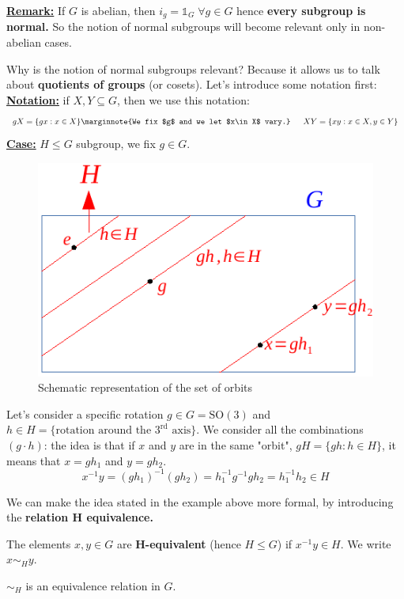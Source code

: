 \documentclass[../main.tex]{subfiles}
\begin{document}
\underline{\textbf{Remark:}} If $G$ is abelian, then $i_g=\mathbb{1}_G\;\forall g\in G$ hence \textbf{every subgroup is normal.} So the notion of normal subgroups will become relevant only in non-abelian cases.

Why is the notion of normal subgroups relevant? Because it allows us to talk about \textbf{quotients of groups} (or cosets). Let's introduce some notation first:\\
\underline{\textbf{Notation:}} if $X,Y\subseteq G$, then we use this notation:
\[
gX=\{gx: x\in X\}\marginnote{We fix $g$ and we let $x\in X$ vary.} \; \quad \; XY=\{xy: x\in X,y\in Y\}
\]
\underline{\textbf{Case:}} $H\le G$ subgroup, we fix $g\in G$.
\begin{figure}[h!]
	\includegraphics{images/orbits.pdf}
	\caption{Schematic representation of the set of orbits}
\end{figure}
\begin{example}
Let's consider a specific rotation $g\in G=\textrm{SO}(3)$ and $h\in H=\{\textrm{rotation around the $3^{\text{rd}}$ axis}\}$. We consider all the combinations $(g\cdot h)$: the idea is that if $x$ and $y$ are in the same "orbit", $gH=\{gh: h\in H\}$, it means that $x=gh_1$ and $y=gh_2$.
\[
x^{-1}y=(gh_1)^{-1}(gh_2)=h_1^{-1}g^{-1}gh_2=h_1^{-1}h_2\in H
\]
\end{example}
We can make the idea stated in the example above more formal, by introducing the \textbf{relation H equivalence.}
\begin{definition}
The elements $x,y\in G$ are \textbf{H-equivalent} (hence $H\le G$) if $x^{-1}y\in H$. We write $x\sim_H y$.
\end{definition}
\begin{lemma}
$\sim_H$ is an equivalence relation in $G$.
\end{lemma}
\end{document}
